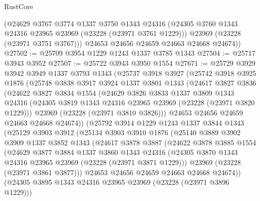 \begin{lexlean}{RustCore}
\begin{coremodule}
        (@24629
          @3767
          @3774
          @1337
          @3750
          @1343
          @24316
          (@24305 @3760 @1343 @24316 @23965 @23969 (@23228 (@23971 @3761 @1229)))
          @23969
          (@23228 (@23971 @3751 @3767)))
        @24653
        @24656
        @24659
        @24663
        @24668
        @24674))
@27502 := @25709 @3954 @1229 @1243 @1337 @3785 @1343
@27504 := @25717 @3943 @3952
@27507 := @25722 @3943 @3950 @1554
@27671 := @25729
    @3929
    @3942
    @3949
    @1337
    @3793
    @1343
    (@25737
      @3918
      @3927
      (@25742
        @3918
        @3925
        @1876
        (@25748
          @3838
          @3917
          @3924
          @1337
          @3801
          @1343
          (@24617
            @3827
            @3836
            (@24622
              @3827
              @3834
              @1554
              (@24629
                @3826
                @3833
                @1337
                @3809
                @1343
                @24316
                (@24305 @3819 @1343 @24316 @23965 @23969 (@23228 (@23971 @3820 @1229)))
                @23969
                (@23228 (@23971 @3810 @3826)))
              @24653
              @24656
              @24659
              @24663
              @24668
              @24674))
          (@25792
            @3914
            @1229
            @1243
            @1337
            @3844
            @1343
            (@25129
              @3903
              @3912
              (@25134
                @3903
                @3910
                @1876
                (@25140
                  @3889
                  @3902
                  @3909
                  @1337
                  @3852
                  @1343
                  (@24617
                    @3878
                    @3887
                    (@24622
                      @3878
                      @3885
                      @1554
                      (@24629
                        @3877
                        @3884
                        @1337
                        @3860
                        @1343
                        @24316
                        (@24305 @3870 @1343 @24316 @23965 @23969 (@23228 (@23971 @3871 @1229)))
                        @23969
                        (@23228 (@23971 @3861 @3877)))
                      @24653
                      @24656
                      @24659
                      @24663
                      @24668
                      @24674))
                  (@24305 @3895 @1343 @24316 @23965 @23969 (@23228 (@23971 @3896 @1229)))

\end{coremodule}
\end{lexlean}

